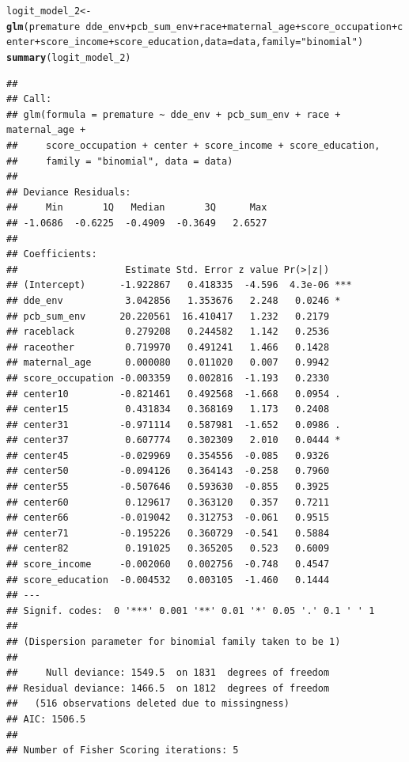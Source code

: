 \documentclass{article}\usepackage[]{graphicx}\usepackage[]{color}
\makeatletter
\newcommand{\hlstr}[1]{\textcolor[rgb]{0.192,0.494,0.8}{#1}}%
\newcommand{\hlopt}[1]{\textcolor[rgb]{0,0,0}{#1}}%
\newcommand{\hlstd}[1]{\textcolor[rgb]{0.345,0.345,0.345}{#1}}%
\newcommand{\hlkwb}[1]{\textcolor[rgb]{0.69,0.353,0.396}{#1}}%
\newcommand{\hlkwc}[1]{\textcolor[rgb]{0.333,0.667,0.333}{#1}}%
\newcommand{\hlkwd}[1]{\textcolor[rgb]{0.737,0.353,0.396}{\textbf{#1}}}%
\newenvironment{kframe}{%
 \def\at@end@of@kframe{}%
 \ifinner\ifhmode%
  \def\at@end@of@kframe{\end{minipage}}%
  \begin{minipage}{\columnwidth}%
 \fi\fi%
 \def\FrameCommand##1{\hskip\@totalleftmargin \hskip-\fboxsep
 \colorbox{shadecolor}{##1}\hskip-\fboxsep
     \hskip-\linewidth \hskip-\@totalleftmargin \hskip\columnwidth}%
 \MakeFramed {\advance\hsize-\width
   \@totalleftmargin\z@ \linewidth\hsize
   \@setminipage}}%
 {\par\unskip\endMakeFramed%
 \at@end@of@kframe}
\newenvironment{knitrout}{}{} %
\makeatother
\begin{document}
\begin{knitrout}
\color{fgcolor}\begin{kframe}
\begin{alltt}
\hlstd{logit_model_2} \hlkwb{<-} \hlkwd{glm}\hlstd{(premature} \hlopt{~} \hlstd{dde_env} \hlopt{+} \hlstd{pcb_sum_env} \hlopt{+} \hlstd{race} \hlopt{+} \hlstd{maternal_age} \hlopt{+} \hlstd{score_occupation} \hlopt{+} \hlstd{center} \hlopt{+} \hlstd{score_income} \hlopt{+} \hlstd{score_education,} \hlkwc{data} \hlstd{= data,} \hlkwc{family} \hlstd{=} \hlstr{"binomial"}\hlstd{)}
\hlkwd{summary}\hlstd{(logit_model_2)}
\end{alltt}
\begin{verbatim}
## 
## Call:
## glm(formula = premature ~ dde_env + pcb_sum_env + race + maternal_age + 
##     score_occupation + center + score_income + score_education, 
##     family = "binomial", data = data)
## 
## Deviance Residuals: 
##     Min       1Q   Median       3Q      Max  
## -1.0686  -0.6225  -0.4909  -0.3649   2.6527  
## 
## Coefficients:
##                   Estimate Std. Error z value Pr(>|z|)    
## (Intercept)      -1.922867   0.418335  -4.596  4.3e-06 ***
## dde_env           3.042856   1.353676   2.248   0.0246 *  
## pcb_sum_env      20.220561  16.410417   1.232   0.2179    
## raceblack         0.279208   0.244582   1.142   0.2536    
## raceother         0.719970   0.491241   1.466   0.1428    
## maternal_age      0.000080   0.011020   0.007   0.9942    
## score_occupation -0.003359   0.002816  -1.193   0.2330    
## center10         -0.821461   0.492568  -1.668   0.0954 .  
## center15          0.431834   0.368169   1.173   0.2408    
## center31         -0.971114   0.587981  -1.652   0.0986 .  
## center37          0.607774   0.302309   2.010   0.0444 *  
## center45         -0.029969   0.354556  -0.085   0.9326    
## center50         -0.094126   0.364143  -0.258   0.7960    
## center55         -0.507646   0.593630  -0.855   0.3925    
## center60          0.129617   0.363120   0.357   0.7211    
## center66         -0.019042   0.312753  -0.061   0.9515    
## center71         -0.195226   0.360729  -0.541   0.5884    
## center82          0.191025   0.365205   0.523   0.6009    
## score_income     -0.002060   0.002756  -0.748   0.4547    
## score_education  -0.004532   0.003105  -1.460   0.1444    
## ---
## Signif. codes:  0 '***' 0.001 '**' 0.01 '*' 0.05 '.' 0.1 ' ' 1
## 
## (Dispersion parameter for binomial family taken to be 1)
## 
##     Null deviance: 1549.5  on 1831  degrees of freedom
## Residual deviance: 1466.5  on 1812  degrees of freedom
##   (516 observations deleted due to missingness)
## AIC: 1506.5
## 
## Number of Fisher Scoring iterations: 5
\end{verbatim}
\end{kframe}
\end{knitrout}
\end{document}
